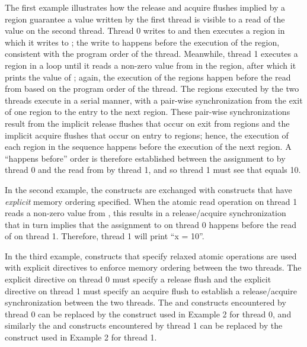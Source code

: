 
The first example illustrates how the release and acquire flushes implied by a
 region guarantee a value written by the first thread is visible
to a read of the value on the second thread. Thread 0 writes to  and
then executes a  region in which it writes to ; the write
to  happens before the execution of the  region,
consistent with the program order of the thread.  Meanwhile, thread 1 executes a
 region in a loop until it reads a non-zero value from
 in the  region, after which it prints the value of
; again, the execution of the  regions happen before the
read from  based on the program order of the thread. The 
regions executed by the two threads execute in a serial manner, with a
pair-wise synchronization from the exit of one  region to the
entry to the next  region.  These pair-wise synchronizations
result from the implicit release flushes that occur on exit from
 regions and the implicit acquire flushes that occur on entry to
 regions; hence, the execution of each  region in
the sequence happens before the execution of the next  region.
A ``happens before'' order is therefore established between the assignment to 
by thread 0 and the read from  by thread 1, and so thread 1 must see that
 equals 10.

\pagebreak
{}

In the second example, the  constructs are exchanged with
 constructs that have \textit{explicit} memory ordering specified. When the
atomic read operation on thread 1 reads a non-zero value from , this
results in a release/acquire synchronization that in turn implies that the
assignment to  on thread 0 happens before the read of  on thread
1. Therefore, thread 1 will print ``x = 10''.


\pagebreak
In the third example,  constructs that specify relaxed atomic
operations are used with explicit  directives to enforce memory
ordering between the two threads. The explicit  directive on thread
0 must specify a release flush and the explicit  directive on
thread 1 must specify an acquire flush to establish a release/acquire
synchronization between the two threads. The  and 
constructs encountered by thread 0 can be replaced by the  construct used in
Example 2 for thread 0, and similarly the  and 
constructs encountered by thread 1 can be replaced by the 
construct used in Example 2 for thread 1.

